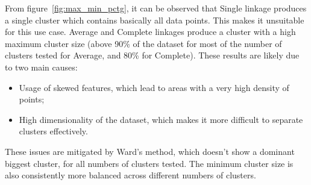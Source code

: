 From figure~\ref{fig:max_min_pctg}, it can be observed that Single linkage produces a single cluster which contains basically all data points. This makes it unsuitable for this use case.
Average and Complete linkages produce a cluster with a high maximum cluster size (above 90\% of the dataset for most
of the number of clusters tested for Average, and 80\% for Complete).
These results are likely due to two main causes: 
\begin{itemize}
    \item Usage of skewed features, which lead to areas with a very high density of points;
    \item High dimensionality of the dataset, which makes it more difficult to separate clusters effectively.
\end{itemize}

These issues are mitigated by Ward's method, which doesn't show a dominant biggest cluster, for
all numbers of clusters tested. The minimum cluster size is also consistently more balanced
across different numbers of clusters.\\
